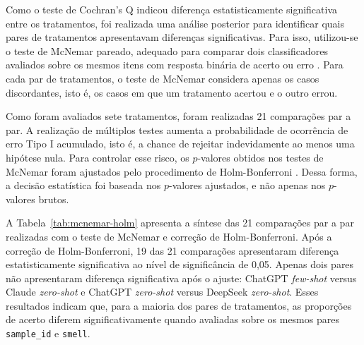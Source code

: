 Como o teste de Cochran's Q indicou diferença estatisticamente significativa entre os tratamentos, foi realizada uma análise posterior para identificar 
quais pares de tratamentos apresentavam diferenças significativas. Para isso, utilizou-se o teste de McNemar pareado, adequado para comparar dois 
classificadores avaliados sobre os mesmos itens com resposta binária de acerto ou erro \cite{conover1999practical}.
Para cada par de tratamentos, o teste de McNemar considera apenas os casos discordantes, isto é, os casos em que um tratamento acertou e o outro errou. 

Como foram avaliados sete tratamentos, foram realizadas 21 comparações par a par. A realização de múltiplos testes aumenta a probabilidade de 
ocorrência de erro Tipo I acumulado, isto é, a chance de rejeitar indevidamente ao menos uma hipótese nula. Para controlar esse risco, 
os $p$-valores obtidos nos testes de McNemar foram ajustados pelo procedimento de Holm-Bonferroni \cite{holm1979simple}. Dessa forma, a decisão estatística foi 
baseada nos $p$-valores ajustados, e não apenas nos $p$-valores brutos.

A Tabela~\ref{tab:mcnemar-holm} apresenta a síntese das 21 comparações par a par realizadas com o teste de McNemar e correção de Holm-Bonferroni. 
Após a correção de Holm-Bonferroni, 19 das 21 comparações apresentaram diferença estatisticamente significativa ao nível de significância de 0,05. 
Apenas dois pares não apresentaram diferença significativa após o ajuste: ChatGPT \textit{few-shot} versus Claude \textit{zero-shot} e ChatGPT \textit{zero-shot} versus DeepSeek \textit{zero-shot}. 
Esses resultados indicam que, para a maioria dos pares de tratamentos, as proporções de acerto diferem significativamente quando avaliadas sobre os 
mesmos pares \texttt{sample\_id} e \texttt{smell}.

